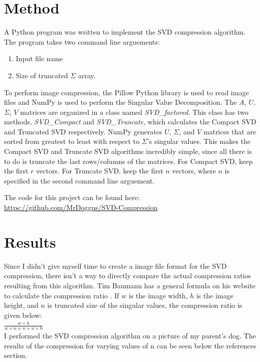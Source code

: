 \documentclass{article}
\begin{document}
\section*{Method}

A Python program was written to implement the SVD compression algorithm. 
The program takes two command line arguements: 
\begin{enumerate}
    \item Input file name
    \item Size of truncated $\Sigma$ array. 
\end{enumerate}

To perform image compression, the Pillow Python library is used to read image files and NumPy is used to perform the Singular Value Decomposition. 
The $A$, $U$, $\Sigma$, $V$ matrices are organized in a class named \emph{SVD\_factored}.
This class has two methods, \emph{SVD\_Compact} and \emph{SVD\_Truncate}, which calculates the Compact SVD and Truncated SVD respectively. 
NumPy generates $U$, $\Sigma$, and $V$ matrices that are sorted from greatest to least with respect to $\Sigma$'s singular values.
This makes the Compact SVD and Truncate SVD algorithms incredibly simple, since all there is to do is truncate the last rows/columns of the matrices.
For Compact SVD, keep the first $r$ vectors.
For Truncate SVD, keep the first $n$ vectors, where $n$ is specified in the second command line arguement. 

The code for this project can be found here: \url{https://github.com/MrDoggus/SVD-Compression}

\section*{Results}

Since I didn't give myself time to create a image file format for the SVD compression, there isn't a way to directly compare the actual compression ratios resulting from this algorithm.
Tim Baumann has a general formula on his website to calculate the compression ratio \cite{tsvd}. 
If $w$ is the image width, $h$ is the image height, and $n$ is truncated size of the singular values, the compression ratio is given below: \\

$ \frac{w \times h}{w \times n + n + n \times h} $ \\

I performed the SVD compression algorithm on a picture of my parent's dog. 
The results of the compression for varying values of n can be seen below the references section.
\end{document}

